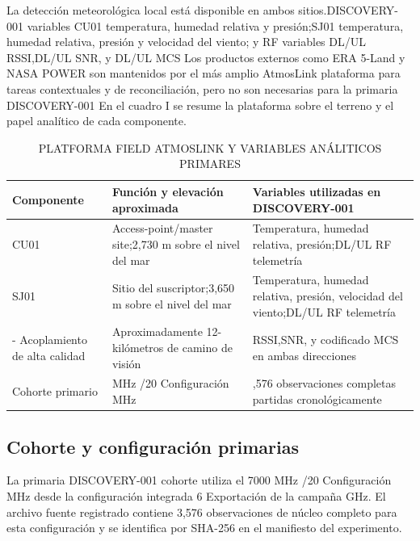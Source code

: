 \documentclass{ieeeaccess}
\begin{document}
La detección meteorológica local está disponible en ambos sitios.DISCOVERY-001 variables CU01 temperatura, humedad relativa y presión;SJ01 temperatura, humedad relativa, presión y velocidad del viento; y RF variables DL/UL RSSI,DL/UL SNR, y DL/UL MCS Los productos externos como ERA 5-Land y NASA POWER son mantenidos por el más amplio AtmosLink plataforma para tareas contextuales y de reconciliación, pero no son necesarias para la primaria DISCOVERY-001 En el cuadro I se resume la plataforma sobre el terreno y el papel analítico de cada componente.

\begin{table}[t]
\caption{PLATFORMA FIELD ATMOSLINK Y VARIABLES ANÁLITICOS PRIMARES}
\label{tab:i}
\centering
\scriptsize
\setlength{\tabcolsep}{3pt}
\renewcommand{\arraystretch}{1.15}
\begin{tabularx}{\textwidth}{>{\raggedright\arraybackslash}X >{\raggedright\arraybackslash}X >{\raggedright\arraybackslash}X}
\toprule
Componente & Función y elevación aproximada & Variables utilizadas en DISCOVERY-001 \\
\midrule
CU01 & Access-point/master site;2,730 m sobre el nivel del mar & Temperatura, humedad relativa, presión;DL/UL RF telemetría \\
SJ01 & Sitio del suscriptor;3,650 m sobre el nivel del mar & Temperatura, humedad relativa, presión, velocidad del viento;DL/UL RF telemetría \\
6- Acoplamiento de alta calidad & Aproximadamente 12- kilómetros de camino de visión & RSSI,SNR, y codificado MCS en ambas direcciones \\
Cohorte primario & 7000 MHz /20 Configuración MHz & 3,576 observaciones completas partidas cronológicamente \\
\bottomrule
\end{tabularx}
\end{table}

\subsection{Cohorte y configuración primarias}\label{cohorte-y-configuraciuxf3n-primarias}

La primaria DISCOVERY-001 cohorte utiliza el 7000 MHz /20 Configuración MHz desde la configuración integrada 6 Exportación de la campaña GHz. El archivo fuente registrado contiene 3,576 observaciones de núcleo completo para esta configuración y se identifica por SHA-256 en el manifiesto del experimento.
\end{document}
